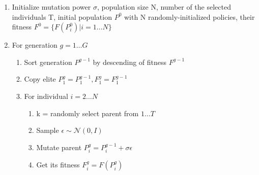 \begin{enumerate}
\item Initialize mutation power \begin{math}\sigma\end{math}, population size N,
  number of the selected individuals T, initial
  population \begin{math}P^0\end{math} with N randomly-initialized
  policies, their fitness \begin{math}F^0=\{F(P^0_i)|i=1 \ldots N\}\end{math}
\item For generation \begin{math}g = 1 \ldots G\end{math}

  \begin{enumerate}
    \item Sort generation \begin{math}P^{g-1}\end{math} by descending of fitness \begin{math}F^{g-1}\end{math}
    \item Copy elite \begin{math}P^g_1=P^{g-1}_1, F_1^g=F_1^{g-1}\end{math}
    \item For individual \begin{math}i = 2\ldots N\end{math}     
      \begin{enumerate}
      \item k = randomly select parent from \begin{math}1\ldots T\end{math}
      \item Sample \begin{math}\epsilon \sim \mathcal{N}(0, I)\end{math}
      \item Mutate parent \begin{math}P_i^g=P_i^{g-1}+\sigma\epsilon\end{math}
      \item Get its fitness \begin{math}F_i^g=F(P_i^g)\end{math}
      \end{enumerate}
  \end{enumerate}
\end{enumerate}


